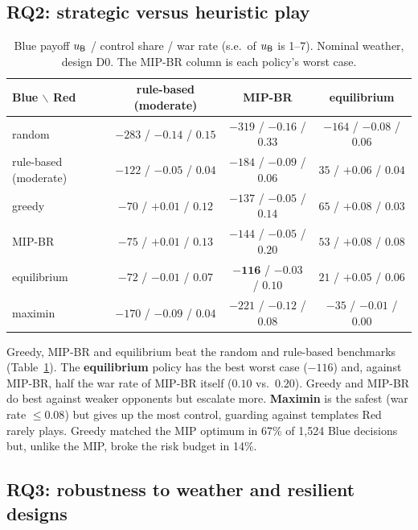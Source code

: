 \subsection{RQ2: strategic versus heuristic play}
\begin{table}[!ht]\centering\footnotesize\setlength{\tabcolsep}{4pt}\renewcommand{\arraystretch}{0.9}
\begin{tabular}{l|ccc}
\toprule
Blue $\backslash$ Red & rule-based (moderate) & MIP-BR & equilibrium\\\midrule
random & $-283$ / $-0.14$ / $0.15$ & $-319$ / $-0.16$ / $0.33$ & $-164$ / $-0.08$ / $0.06$\\
rule-based (moderate) & $-122$ / $-0.05$ / $0.04$ & $-184$ / $-0.09$ / $0.06$ & $35$ / $+0.06$ / $0.04$\\
greedy & $-70$ / $+0.01$ / $0.12$ & $-137$ / $-0.05$ / $0.14$ & $65$ / $+0.08$ / $0.03$\\
MIP-BR & $-75$ / $+0.01$ / $0.13$ & $-144$ / $-0.05$ / $0.20$ & $53$ / $+0.08$ / $0.08$\\
equilibrium & $-72$ / $-0.01$ / $0.07$ & $\mathbf{-116}$ / $-0.03$ / $0.10$ & $21$ / $+0.05$ / $0.06$\\
maximin & $-170$ / $-0.09$ / $0.04$ & $-221$ / $-0.12$ / $0.08$ & $-35$ / $-0.01$ / $0.00$\\
\bottomrule
\end{tabular}
\caption{Blue payoff $u_{\mathsf{B}}$ / control share / war rate (s.e.\ of $u_{\mathsf{B}}$ is 1--7). Nominal weather, design D0. The
MIP-BR column is each policy's worst case.}
\label{tab:policies}
\end{table}
Greedy, MIP-BR and equilibrium beat the random and rule-based benchmarks (Table~\ref{tab:policies}). The
\textbf{equilibrium} policy has the best worst case ($-116$) and, against MIP-BR, half the war rate of MIP-BR itself
($0.10$ vs.\ $0.20$). Greedy and MIP-BR do best against weaker opponents but escalate more. \textbf{Maximin} is the
safest (war rate $\le0.08$) but gives up the most control, guarding against templates Red rarely plays.
Greedy matched the MIP optimum in 67\% of 1{,}524 Blue decisions but, unlike the MIP, broke the risk budget in 14\%.

\subsection{RQ3: robustness to weather and resilient designs}

